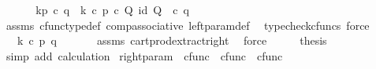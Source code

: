 \begin{isabellebody}
%
\isadelimproof
%
\endisadelimproof
%
\isatagproof
{}\isamarkupfalse%
\ {\isacharminus}{\kern0pt}\ \isanewline
\ \ \isamarkupfalse%
\ {\isachardoublequoteopen}k\isactrlbsub {\isacharbrackleft}{\kern0pt}p{\isacharcomma}{\kern0pt}{\isacharminus}{\kern0pt}{\isacharbrackright}{\kern0pt}\isactrlesub \ {\isasymcirc}\isactrlsub c\ q\ {\isacharequal}{\kern0pt}\ k\ {\isasymcirc}\isactrlsub c\ {\isasymlangle}p\ {\isasymcirc}\isactrlsub c\ {\isasymbeta}\isactrlbsub Q\isactrlesub {\isacharcomma}{\kern0pt}\ id\ Q{\isasymrangle}\ \ {\isasymcirc}\isactrlsub c\ q{\isachardoublequoteclose}\isanewline
\ \ \ \ \isamarkupfalse%
\ assms\ cfunc{\isacharunderscore}{\kern0pt}type{\isacharunderscore}{\kern0pt}def\ comp{\isacharunderscore}{\kern0pt}associative\ left{\isacharunderscore}{\kern0pt}param{\isacharunderscore}{\kern0pt}def{}\ \isamarkupfalse%
\ {\isacharparenleft}{\kern0pt}typecheck{\isacharunderscore}{\kern0pt}cfuncs{\isacharcomma}{\kern0pt}\ force{\isacharparenright}{\kern0pt}\isanewline
\ \ \isamarkupfalse%
\ \isamarkupfalse%
\ {\isachardoublequoteopen}{\isachardot}{\kern0pt}{\isachardot}{\kern0pt}{\isachardot}{\kern0pt}\ {\isacharequal}{\kern0pt}\ k\ {\isasymcirc}\isactrlsub c\ {\isasymlangle}p{\isacharcomma}{\kern0pt}\ q{\isasymrangle}{\isachardoublequoteclose}\isanewline
\ \ \ \ \isamarkupfalse%
\ \ assms{\isacharparenleft}{\kern0pt}{}{\isacharcomma}{\kern0pt}{}{\isacharparenright}{\kern0pt}\ cart{\isacharunderscore}{\kern0pt}prod{\isacharunderscore}{\kern0pt}extract{\isacharunderscore}{\kern0pt}right\ \isamarkupfalse%
\ force\isanewline
\ \ \isamarkupfalse%
\ \isamarkupfalse%
\ {\isacharquery}{\kern0pt}thesis\isanewline
\ \ \ \ \isamarkupfalse%
\ {\isacharparenleft}{\kern0pt}simp\ add{\isacharcolon}{\kern0pt}\ calculation{\isacharparenright}{\kern0pt}\isanewline
{}\isamarkupfalse%
%
\endisatagproof
{\isafoldproof}%
%
\isadelimproof
\isanewline
%
\endisadelimproof
\isanewline
{}\isamarkupfalse%
\ right{\isacharunderscore}{\kern0pt}param\ {\isacharcolon}{\kern0pt}{\isacharcolon}{\kern0pt}\ {\isachardoublequoteopen}cfunc\ {\isasymRightarrow}\ cfunc\ {\isasymRightarrow}\ cfunc{\isachardoublequoteclose}\ {\isacharparenleft}{\kern0pt}{\isachardoublequoteopen}{\isacharunderscore}{\kern0pt}\isactrlbsub {\isacharbrackleft}{\kern0pt}{\isacharminus}{\kern0pt}{\isacharcomma}{\kern0pt}{\isacharunderscore}{\kern0pt}{\isacharbrackright}{\kern0pt}\isactrlesub {\isachardoublequoteclose}\ {\isacharbrackleft}{\kern0pt}{}{}{}{\isacharcomma}{\kern0pt}{}{\isacharbrackright}{\kern0pt}{}{}{}{\isacharparenright}{\kern0pt}\ \isanewline

\end{isabellebody}
